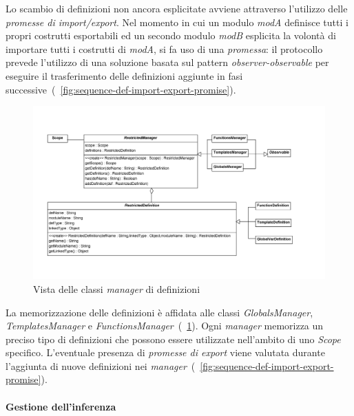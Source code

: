 Lo scambio di definizioni non ancora esplicitate avviene attraverso l'utilizzo delle \emph{promesse di import/export}. Nel momento in cui un modulo \emph{modA} definisce tutti i propri costrutti esportabili ed un secondo modulo \emph{modB} esplicita la volontà di importare tutti i costrutti di \emph{modA}, si fa uso di una \emph{promessa}: il protocollo prevede l'utilizzo di una soluzione basata sul pattern \emph{observer-observable} per eseguire il trasferimento delle definizioni aggiunte in fasi successive~(\figurename~\ref{fig:sequence-def-import-export-promise}).

\begin{figure}
\centering
\includegraphics[width=1\textwidth]{Immagini/Capitolo3/Classi/myclips_RestrictedManager.png}
\caption{Vista delle classi \emph{manager} di definizioni}\label{fig:class-myclips-restricted-manager}
\end{figure}

La memorizzazione delle definizioni è affidata alle classi \emph{GlobalsManager}, \emph{TemplatesManager} e \emph{FunctionsManager}~(\figurename~\ref{fig:class-myclips-restricted-manager}). 
Ogni \emph{manager} memorizza un preciso tipo di definizioni che possono essere utilizzate nell'ambito di uno \emph{Scope} specifico. L'eventuale presenza di \emph{promesse di export} viene valutata durante l'aggiunta di nuove definizioni nei \emph{manager}~(\figurename~\ref{fig:sequence-def-import-export-promise}).

\clearpage

\paragraph{Gestione dell'inferenza}


